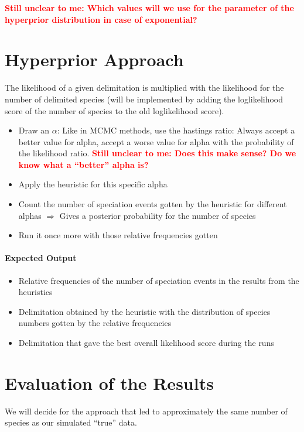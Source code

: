 \documentclass[10pt,a4paper]{article}
\begin{document}
\textcolor{red}{\textbf{Still unclear to me: Which values will we use for the parameter of the hyperprior distribution in case of exponential?}}

\section{Hyperprior Approach}
The likelihood of a given delimitation is multiplied with the likelihood for the number of delimited species (will be implemented by adding the loglikelihood score of the number of species to the old loglikelihood score).


\begin{itemize}
	\item Draw an $\alpha$: Like in MCMC methods, use the hastings ratio: Always accept a better value for alpha, accept a worse value for alpha with the probability of the likelihood ratio.
	\textcolor{red}{\textbf{Still unclear to me: Does this make sense? Do we know what a ``better'' alpha is?}}
	\item Apply the heuristic for this specific alpha
	\item Count the number of speciation events gotten by the heuristic for different alphas $\Rightarrow$ Gives a posterior probability for the number of species
	\item Run it once more with those relative frequencies gotten
\end{itemize}

\paragraph{Expected Output}
\begin{itemize}
\item Relative frequencies of the number of speciation events in the results from the heuristics
\item Delimitation obtained by the heuristic with the distribution of species numbers gotten by the relative frequencies
\item Delimitation that gave the best overall likelihood score during the runs 
\end{itemize}

\section{Evaluation of the Results}
We will decide for the approach that led to approximately the same number of species as our simulated ``true'' data.
\end{document}
